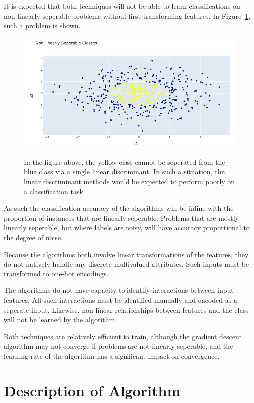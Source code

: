 \documentclass{amsart}
\begin{document}
    It is expected that both techniques will not be able to learn
    classifications on non-linearly seperable problems without
    first transforming features. In Figure~\ref{nonseperable_classes},
    such a problem is shown.
    \begin{figure}[H]
        \centering
        \includegraphics[width=.9 \textwidth]{non-seperable.png}
        \label{nonseperable_classes}
        \caption{In the figure above, the yellow class cannot be seperated from the
        blue class via a single linear discriminant. In such a situation,
        the linear discriminant methods would be expected to perform
        poorly on a classification task.
        }
    \end{figure}
    As such the classification accuracy of the algorithms will be inline with
    the proportion of instances that are linearly seperable. Problems that are
    mostly linearly seperable, but where labels are noisy, will have accuracy proportional
    to the degree of noise.

    Because the algorithms both involve linear transformations of the
    features, they do not natively handle any discrete-multivalued attributes.
    Such inputs must be transformed to one-hot encodings.

    The algorithms do not have capacity to identify interactions between
    input features. All such interactions must be identified manually and encoded
    as a seperate input. Likewise,
    non-linear relationships between features and the class
    will not be learned by the algorithm.

    Both techniques are relatively efficient to train, although the
    gradient descent algorithm may not converge if problems are not linearly
    seperable, and the learning rate of the algorithm has a significant impact on convergence.

    \section{Description of Algorithm}
\end{document}
